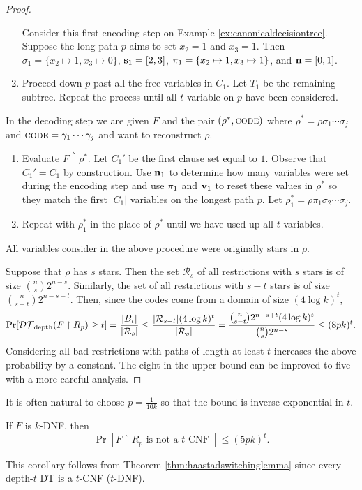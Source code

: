 \documentclass[11pt]{article}
\begin{document}
\begin{proof}
\begin{enumerate}
			Consider this first encoding step on Example \ref{ex:canonicaldecisiontree}. Suppose the long path $p$ aims to set $x_2 = 1$ and $x_3 = 1$. Then $\sigma_1 = \{x_2 \mapsto 1, x_3 \mapsto 0\}$, $\mathbf{s}_1 = [2,3]$, $\mathbf{\pi}_1 = \{x_2 \mapsto 1, x_3 \mapsto 1\}$, and $\mathbf{n} = [0,1]$.
			\item Proceed down $p$ past all the free variables in $C_{1}$. Let $T_1$ be the remaining subtree. Repeat the process until all $t$ variable on $p$ have been considered.    
		\end{enumerate}
		
		In the decoding step we are given $F$ and the pair $(\rho^*, \textsc{code})$ where $\rho^* = \rho\sigma_1\cdots\sigma_j$ and $\textsc{code} = \gamma_1\cdots\gamma_j$ and want to reconstruct $\rho$.
		\begin{enumerate}
			\item Evaluate $F \upharpoonright \rho^*$. Let $C_1'$ be the first clause set equal to $1$. Observe that $C_1' = C_{1}$ by construction. Use $\mathbf{n}_1$ to determine how many variables were set during the encoding step and use $\mathbf{\pi}_1$ and $\mathbf{v}_1$ to reset these values in $\rho^*$ so they match the first $|C_1|$ variables on the longest path $p$. Let $\rho^*_1 = \rho\pi_1\sigma_2\cdots\sigma_j$.
			\item Repeat with $\rho^*_1$ in the place of $\rho^*$ until we have used up all $t$ variables.
		\end{enumerate}
		All variables consider in the above procedure were originally stars in $\rho$. 
		
		Suppose that $\rho$ has $s$ stars. Then the set $\mathcal{R}_s$ of all restrictions with $s$ stars is of size $\binom{n}{s}2^{n-s}$. Similarly, the set of all restrictions with $s - t$ stars is of size $\binom{n}{s-t}2^{n-s+t}$. Then, since the codes come from a domain of size $(4\log k)^t$,
		\[\Pr[\mathcal{DT}_{\mathrm{depth}}(F \upharpoonright R_p) \geq t] = \frac{|B_t|}{|\mathcal{R}_s|} \leq  \frac{|\mathcal{R}_{s-t}|(4\log k)^t}{|\mathcal{R}_s|} = \frac{\binom{n}{s-t}2^{n-s+t}(4\log k)^t}{\binom{n}{s}2^{n-s}} \leq (8pk)^t.\]
		Considering all bad restrictions with paths of length at least $t$ increases the above probability by a constant. The eight in the upper bound can be improved to five with a more careful analysis.
	\end{proof}
	
	It is often natural to choose $p = \frac{1}{10k}$ so that the bound is inverse exponential in $t$. 
	\begin{corollary}
		If $F$ is $k$-DNF, then 
		\[\Pr\left[F \upharpoonright R_p \mbox{ is not a $t$-CNF }\right] \leq (5pk)^t.\]
	\end{corollary}
	This corollary follows from Theorem \ref{thm:haastadswitchinglemma} since every depth-$t$ DT is a $t$-CNF ($t$-DNF).   
	
\end{document}
